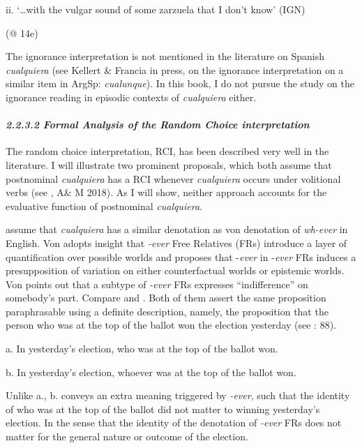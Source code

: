\documentclass[output=paper]{langscibook}
\begin{document}
  ii.  ‘…with the vulgar sound of some zarzuela that I don’t know’ (IGN)

  (@ 14e)

The ignorance interpretation is not mentioned in the literature on Spanish \textit{cualquiera} (see Kellert \& Francia in press, on the ignorance interpretation on a similar item in ArgSp: \textit{cualunque}). In this book, I do not pursue the study on the ignorance reading in episodic contexts of \textit{cualquiera} either. 

\paragraph{\textit{2.2.3.2 Formal Analysis of the Random Choice interpretation}}

The random choice interpretation, RCI, has been described very well in the literature. I will illustrate two prominent proposals, which both assume that postnominal \textit{cualquiera} has a RCI whenever \textit{cualquiera} occurs under volitional verbs (see \citealt{ChoiRomero2008}, A\& M 2018). As I will show, neither approach accounts for the evaluative function of postnominal \textit{cualquiera}.

\citet{ChoiRomero2008} assume that \textit{cualquiera} has a similar denotation as von  denotation of \textit{wh-ever} in English. Von \citet{Fintel2000} adopts  insight that \textit{\nobreakdash-ever} Free Relatives (FRs) introduce a layer of quantification over possible worlds and proposes that \nobreakdash-\textit{ever} in \nobreakdash-\textit{ever} FRs induces a presupposition of variation on either counterfactual worlds or epistemic worlds. Von \citet{Fintel2000} points out that a subtype of \textit{\nobreakdash-ever} FRs expresses “indifference” on somebody’s part. Compare  and . Both of them assert the same proposition paraphrasable using a definite description, namely, the proposition that the person who was at the top of the ballot won the election yesterday (see \citealt{ChoiRomero2008}: 88).

\label{bkm:Ref533762240}  a.  In yesterday’s election, who was at the top of the ballot won.

  b.  In yesterday’s election, whoever was at the top of the ballot won.

Unlike a., b. conveys an extra meaning triggered by \textit{\nobreakdash-ever}, such that the identity of who was at the top of the ballot did not matter to winning yesterday’s election. In the sense that the identity of the denotation of \textit{\nobreakdash-ever} FRs does not matter for the general nature or outcome of the election.
\end{document}
